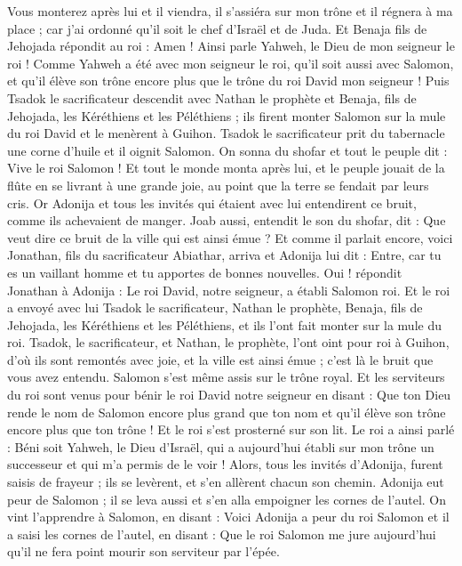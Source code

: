\begin{multicols}{2}
Vous monterez après lui et il viendra, il s'assiéra sur mon trône et il régnera à ma place ; car j'ai ordonné qu'il soit le chef d'Israël et de Juda.
Et Benaja fils de Jehojada répondit au roi : Amen ! Ainsi parle Yahweh, le Dieu de mon seigneur le roi !
Comme Yahweh a été avec mon seigneur le roi, qu'il soit aussi avec Salomon, et qu'il élève son trône encore plus que le trône du roi David mon seigneur !
Puis Tsadok le sacrificateur descendit avec Nathan le prophète et Benaja, fils de Jehojada, les Kéréthiens et les Péléthiens ; ils firent monter Salomon sur la mule du roi David et le menèrent à Guihon.
Tsadok le sacrificateur prit du tabernacle une corne d'huile et il oignit Salomon. On sonna du shofar et tout le peuple dit : Vive le roi Salomon !
Et tout le monde monta après lui, et le peuple jouait de la flûte en se livrant à une grande joie, au point que la terre se fendait par leurs cris.
Or Adonija et tous les invités qui étaient avec lui entendirent ce bruit, comme ils achevaient de manger. Joab aussi, entendit le son du shofar, dit : Que veut dire ce bruit de la ville qui est ainsi émue ?
Et comme il parlait encore, voici Jonathan, fils du sacrificateur Abiathar, arriva et Adonija lui dit : Entre, car tu es un vaillant homme et tu apportes de bonnes nouvelles.
Oui ! répondit Jonathan à Adonija : Le roi David, notre seigneur, a établi Salomon roi.
Et le roi a envoyé avec lui Tsadok le sacrificateur, Nathan le prophète, Benaja, fils de Jehojada, les Kéréthiens et les Péléthiens, et ils l'ont fait monter sur la mule du roi.
Tsadok, le sacrificateur, et Nathan, le prophète, l'ont oint pour roi à Guihon, d'où ils sont remontés avec joie, et la ville est ainsi émue ; c'est là le bruit que vous avez entendu.
Salomon s'est même assis sur le trône royal.
Et les serviteurs du roi sont venus pour bénir le roi David notre seigneur en disant : Que ton Dieu rende le nom de Salomon encore plus grand que ton nom et qu'il élève son trône encore plus que ton trône ! Et le roi s'est prosterné sur son lit.
Le roi a ainsi parlé : Béni soit Yahweh, le Dieu d'Israël, qui a aujourd'hui établi sur mon trône un successeur et qui m'a permis de le voir !
Alors, tous les invités d'Adonija, furent saisis de frayeur ; ils se levèrent, et s'en allèrent chacun son chemin.
Adonija eut peur de Salomon ; il se leva aussi et s'en alla empoigner les cornes de l'autel.
On vint l'apprendre à Salomon, en disant : Voici Adonija a peur du roi Salomon et il a saisi les cornes de l'autel, en disant : Que le roi Salomon me jure aujourd'hui qu'il ne fera point mourir son serviteur par l'épée.

\end{multicols}
